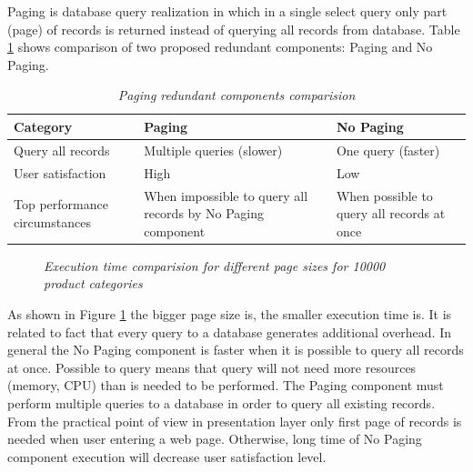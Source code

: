 \documentclass[10pt,a4paper]{article}
\begin{document}
Paging is database query realization in which in a single select query only part (page) of records is returned instead of querying all records from database. Table \ref{pagingcomponents} shows comparison of two proposed redundant components: Paging and No Paging.  
\begin{table}[!htb]
\def\arraystretch{1.5}
\caption{\textit{Paging redundant components comparision}}\label{pagingcomponents}
\begin{tabularx}{\textwidth}{p{3cm}|X|X}
  \textbf{Category} &\textbf{Paging} & \textbf{No Paging} \\
\hline
Query all records & Multiple queries (slower) & One query (faster) \\
User satisfaction & High & Low\\
Top performance circumstances & When impossible to query all records by No Paging component & When possible to query all records at once\\
\end{tabularx}
\end{table}

\begin{figure}[!htb]
\centering
{}

\caption{\textit{Execution time comparision for different page sizes for 10000 product categories}} \label{fig:pagesizetime}

\end{figure}

As shown in Figure \ref{fig:pagesizetime} the bigger page size is, the smaller execution time is. It is related to fact that every query to a database generates additional overhead. 
In general the No Paging component is faster when it is possible to query all records at once. Possible to query means that query will not need more resources (memory, CPU) than is needed to be performed. 
The Paging component must perform multiple queries to a database in order to query all existing records. From the practical point of view in presentation layer only first page of records is needed when user entering a web page. Otherwise, long time of No Paging component execution will decrease user satisfaction level.  
\end{document}
